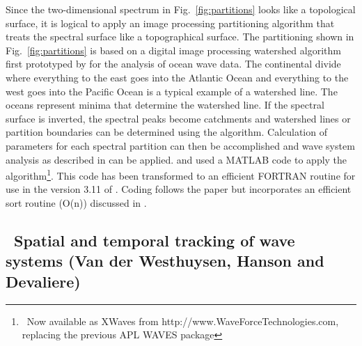 Since the two-dimensional spectrum in Fig.~\ref{fig:partitions} looks like a
topological surface, it is logical to apply an image processing partitioning
algorithm that treats the spectral surface like a topographical surface.  The
partitioning shown in Fig.~\ref{fig:partitions} is based on a digital image
processing watershed algorithm \citep{art:VS91} first prototyped by
\cite{pro:HJ04} for the analysis of ocean wave data. The continental divide
where everything to the east goes into the Atlantic Ocean and everything to
the west goes into the Pacific Ocean is a typical example of a watershed line.
The oceans represent minima that determine the watershed line.  If the
spectral surface is inverted, the spectral peaks become catchments and
watershed lines or partition boundaries can be determined using the
\cite{art:VS91} algorithm.  Calculation of parameters for each spectral
partition can then be accomplished and wave system analysis as described in
\cite{art:HP01} can be applied.  \cite{pro:HJ04} and \cite{tol:Vict06b} used a
MATLAB code to apply the \cite{art:VS91} algorithm\footnote{~Now available as
XWaves from http://www.WaveForceTechnologies.com, replacing the previous APL
WAVES package}.  This code has been transformed to an efficient FORTRAN
routine for use in the version 3.11 of \ws.  Coding follows the
\cite{art:VS91} paper but incorporates an efficient sort routine (O(n))
discussed in \cite{rep:TTH06}.


\vssub
\subsection{~Spatial and temporal tracking of wave systems 
\hfill {\rm (Van der Westhuysen, Hanson and Devaliere)}}
\vssub


